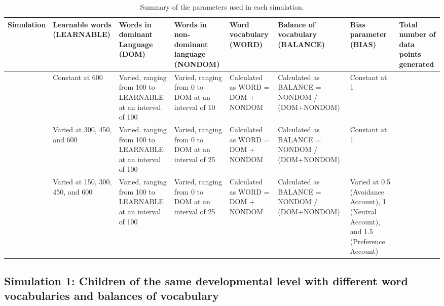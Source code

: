 \documentclass[
  english,
  ,man,floatsintext]{apa6}
\begin{document}
\begin{landscape}\begin{table}

\caption{\label{tab:table2}Summary of the parameters used in each simulation.}
\centering
\fontsize{8}{10}\selectfont
\begin{tabular}[t]{>{\centering\arraybackslash}p{45px}>{\raggedright\arraybackslash}p{45px}>{\raggedright\arraybackslash}p{75px}>{\raggedright\arraybackslash}p{75px}>{\raggedright\arraybackslash}p{75px}>{\raggedright\arraybackslash}p{75px}>{\raggedright\arraybackslash}p{75px}>{\raggedright\arraybackslash}p{45px}}
\toprule
Simulation & Learnable words (LEARNABLE) & Words in dominant Language (DOM) & Words in non-dominant language (NONDOM) & Word vocabulary (WORD) & Balance of vocabulary (BALANCE) & Bias parameter (BIAS) & Total number of data points generated\\
\midrule
1 & Constant at 600 & Varied, ranging from 100 to LEARNABLE at an interval of 100 & Varied, ranging from 0 to DOM at an interval of 10 & Calculated as WORD = DOM + NONDOM & Calculated as BALANCE = NONDOM / (DOM+NONDOM) & Constant at 1 & 216\\
2 & Varied at 300, 450, and 600 & Varied, ranging from 100 to LEARNABLE at an interval of 100 & Varied, ranging from 0 to DOM at an interval of 25 & Calculated as WORD = DOM + NONDOM & Calculated as BALANCE = NONDOM / (DOM+NONDOM) & Constant at 1 & 161\\
3 & Varied at 150, 300, 450, and 600 & Varied, ranging from 100 to LEARNABLE at an interval of 100 & Varied, ranging from 0 to DOM at an interval of 25 & Calculated as WORD = DOM + NONDOM & Calculated as BALANCE = NONDOM / (DOM+NONDOM) & Varied at 0.5 (Avoidance Account), 
 1 (Neutral Account), 
 and 1.5 (Preference Account) & 166\\
\bottomrule
\end{tabular}
\end{table}
\end{landscape}

\hypertarget{simulation-1-children-of-the-same-developmental-level-with-different-word-vocabularies-and-balances-of-vocabulary}{%
\subsection{Simulation 1: Children of the same developmental level with different word vocabularies and balances of vocabulary}\label{simulation-1-children-of-the-same-developmental-level-with-different-word-vocabularies-and-balances-of-vocabulary}}
\end{document}
